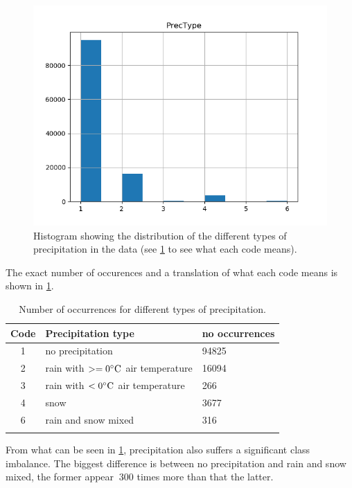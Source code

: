 	\begin{figure}[H] 
	\centering
	\includegraphics[width=1\textwidth]{media/histogram_prectype.png}
	\caption{Histogram showing the distribution of the different types of precipitation in the data (see \ref{table:occurences_prectype} to see what each code means).}
	\label{img:correlations_featureengi}
	\end{figure}

	The exact number of occurences and a translation of what each code means is shown in \ref{table:occurences_prectype}.

	\begin{table}[H]
	\centering
	\caption{Number of occurrences for different types of precipitation. }
		\begin{tabular}[3]{c | l | l}
    			Code & Precipitation type & no occurrences \\
    			\hline
			1 & no precipitation & 94825 \\
			2 & rain with $>= 0 \celsius$ air temperature & 16094 \\
			3 & rain with $< 0 \celsius$ air temperature & 266 \\
			4 & snow & 3677 \\
			6 & rain and snow mixed & 316 \\
			\label{table:occurences_prectype}
		\end{tabular}
	\end{table}

	From what can be seen in \ref{table:occurences_prectype}, precipitation also suffers a significant class imbalance. The biggest difference is between no precipitation and rain and snow mixed, the former appear $~300$ times more than that the latter.

